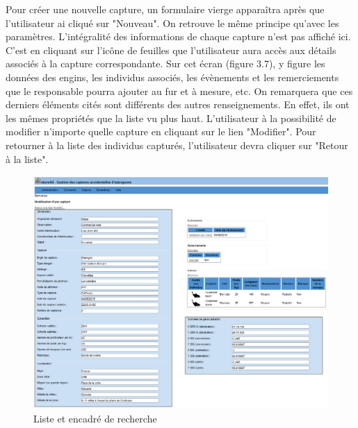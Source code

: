 \documentclass[12pt,a4paper,titlepage,twoside]{report}
\begin{document}
\clearpage
Pour créer une nouvelle capture, un formulaire vierge apparaîtra après que l'utilisateur ai cliqué sur "Nouveau". On retrouve le même principe qu'avec les paramètres. L'intégralité des informations de chaque capture n'est pas affiché ici. C'est en cliquant sur l'icône de feuilles que l'utilisateur aura accès aux détails associés à la capture correspondante. Sur cet écran (figure 3.7), y figure les données des engins, les individus associés, les évènements et les remerciements que le responsable pourra ajouter au fur et à mesure, etc. On remarquera que ces derniers éléments cités sont différents des autres renseignements. En effet, ils ont les mêmes propriétés que la liste vu plus haut. L'utilisateur à la possibilité de modifier n'importe quelle capture en cliquant sur le lien "Modifier". Pour retourner à la liste des individus capturés, l'utilisateur devra cliquer sur "Retour à la liste". 

\begin{figure}[h]
\centering
\includegraphics[width=\textwidth]{pictures/detailCapture.png}
\caption{Liste et encadré de recherche}
\end{figure}
\clearpage
\end{document}

